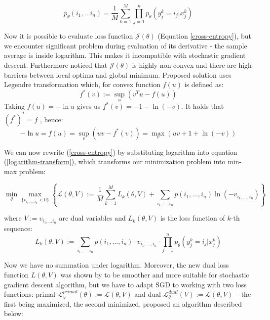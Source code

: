 \documentclass[declaration,shortabstract,lic,english]{iithesis}
\begin{document}
\begin{equation} \label{expected-probability}
    \overline{p}_\theta(i_1, \dots i_n) = \frac{1}{M}\sum_{k=1}^{M}\prod_{j=1}^{n}p_\theta(y_j^k = i_j | x_j^k)
\end{equation}

Now it is possible to evaluate loss function $\mathcal{J}(\theta)$ (Equation \ref{cross-entropy}), but we encounter significant problem during evaluation of its derivative - the sample average is inside logarithm. This makes it incompatible with stochastic gradient descent. Furthermore \citet{liu2017unsupervised} noticed that $\mathcal{J}(\theta)$ is highly non-convex and there are high barriers between local optima and global minimum. Proposed solution uses Legendre transformation \citep{nielsen2010legendre, boyd2004convex} which, for convex function $f(u)$ is defined as:
\begin{equation} \label{legendre-transformation}
    f^*(v) := \sup_{u}(v^Tu - f(u))
\end{equation}
Taking $f(u)=-\ln u$ gives us $f^*(v) = -1 - \ln(-v)$. It holds that $(f^*)^* = f$ \citep{boyd2004convex}, hence:
\begin{equation} \label{logarithm-transform}
    - \ln u = f(u) = \sup_v(uv - f^*(v)) = \max_v(uv + 1 + \ln(-v))
\end{equation}

We can now rewrite (\ref{cross-entropy}) by substituting logarithm into equation (\ref{logarithm-transform}), which transforms our minimization problem into min-max problem:

\begin{equation} \label{min-max-definition}
    \min_\theta \max_{\lbrace v_{i_1, \dots , i_n} < 0 \rbrace} \left\lbrace 
    \mathcal{L}(\theta, V) := \frac{1}{M} \sum_{k=1}^M L_k(\theta, V) + \sum_{i_1, \dots, i_n} p(i_1, \dots, i_n) \ln(-v_{i_1, \dots, i_n})
    \right\rbrace 
\end{equation}

where $V := {v_{i_1, \dots i_n}}$ are dual variables and $L_k(\theta, V)$ is the loss function of $k$-th sequence:
\begin{equation}
    L_k(\theta, V) := \sum_{i_1,\dots,i_n} p(i_1,\dots,i_n) \cdot v_{i_1,\dots,i_n} \cdot \prod_{j=1}^{n} p_\theta(y^k_j = i_j | x^k_j)
\end{equation}

Now we have no summation under logarithm. Moreover, the new dual loss function $L(\theta, V)$ was shown by \citet{liu2017unsupervised} to be smoother and more suitable for stochastic gradient descent algorithm, but we have to adapt SGD to working with two loss functions: primal $\mathcal{L}_V^{primal}(\theta) := \mathcal{L}(\theta, V)$ and dual $\mathcal{L}_\theta^{dual}(V) := \mathcal{L}(\theta, V)$ -- the first being maximized, the second minimized. \citet{liu2017unsupervised} proposed an algorithm described below:
\end{document}

